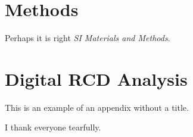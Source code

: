 \documentclass{pnastwo}
\begin{document}
\begin{article}
\begin{materials}
\section{Methods} 
Perhaps it is right {\it SI Materials and Methods}.

\section{Digital RCD Analysis} 

\end{materials}

\appendix[App 1]

\appendix
This is an example of an appendix without a title.

\begin{acknowledgments}
I thank everyone tearfully. 
\end{acknowledgments}


 


%


\end{article}
\end{document}
